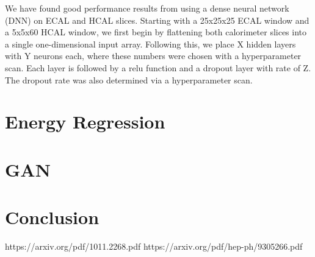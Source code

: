 \documentclass{article}
\begin{document}
    We have found good performance results from using a dense neural network (DNN) on ECAL and HCAL slices. Starting with a 25x25x25 ECAL window and a 5x5x60 HCAL window, we first begin by flattening both calorimeter slices into a single one-dimensional input array. Following this, we place X hidden layers with Y neurons each, where these numbers were chosen with a hyperparameter scan. Each layer is followed by a relu function and a dropout layer with rate of Z. The dropout rate was also determined via a hyperparameter scan.

    \section*{Energy Regression}

    \section*{GAN}

    \section*{Conclusion}

    \clearpage
    \begin{thebibliography}{9}

         https://arxiv.org/pdf/1011.2268.pdf
         https://arxiv.org/pdf/hep-ph/9305266.pdf

    \end{thebibliography}
\end{document}
